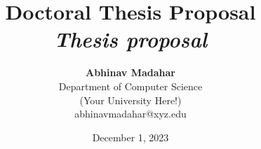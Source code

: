 \documentclass[12pt]{article}
\title{{\bf Doctoral Thesis Proposal} \\
\it Thesis proposal}
\author{ {\bf Abhinav Madahar}  \\
Department of Computer Science \\
(Your University Here!) \\
{\small abhinavmadahar@xyz.edu}
}
\date{December 1, 2023}
\begin{document}
\pagestyle{plain}
\maketitle

\pagebreak
\begin{abstract}

\end{abstract}

\pagebreak
\tableofcontents
\pagebreak

\cleardoublepage
{}


\begin{footnotesize}


\end{footnotesize}
\end{document}
